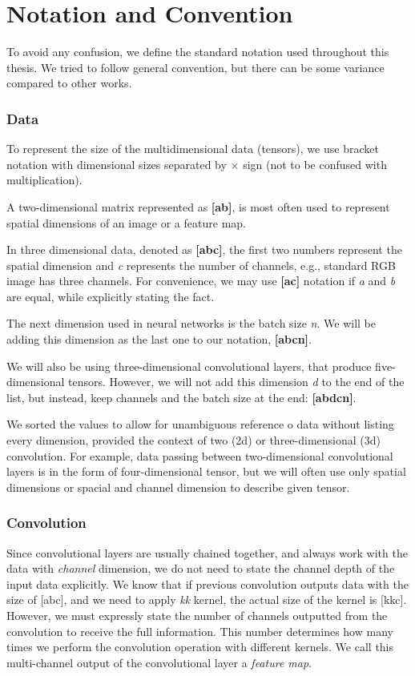\section{Notation and Convention}
\label{sec:notation}
To avoid any confusion, we define the standard notation used throughout this thesis. We tried to follow general convention, but there can be some variance compared to other works.

\subsubsection*{Data}

To represent the size of the multidimensional data (tensors), we use bracket notation with dimensional sizes separated by $\times $ sign (not to be confused with multiplication).

A two-dimensional matrix represented as \textbf{[a\x b]}, is most often used to represent spatial dimensions of an image or a feature map. 

In three dimensional data, denoted as \textbf{[a\x b\x c]}, the first two numbers represent the spatial dimension and \textit{c} represents the number of channels, e.g., standard RGB image has three channels. For convenience, we may use \textbf{[a\x c]} notation if \textit{a} and \textit{b} are equal, while explicitly stating the fact.

The next dimension used in neural networks is the batch size \textit{n}. We will be adding this dimension as the last one to our notation, \textbf{[a\x b\x c\x n]}.

We will also be using three-dimensional convolutional layers, that produce five-dimensional tensors. However, we will not add this dimension \textit{d} to the end of the list, but instead, keep channels and the batch size at the end: \textbf{[a\x b\x d\x c\x n]}. 

We sorted the values to allow for unambiguous reference o data without listing every dimension, provided the context of two (2d) or three-dimensional (3d) convolution. For example, data passing between two-dimensional convolutional layers is in the form of four-dimensional tensor, but we will often use only spatial dimensions or spacial and channel dimension to describe given tensor.

\subsubsection*{Convolution}
Since convolutional layers are usually chained together, and always work with the data with \textit{channel} dimension, we do not need to state the channel depth of the input data explicitly. We know that if previous convolution outputs data with the size of [a\x b\x c], and we need to apply \textit{k\x k} kernel, the actual size of the kernel is [k\x k\x c]. However, we must expressly state the number of channels outputted from the convolution to receive the full information. This number determines how many times we perform the convolution operation with different kernels. We call this multi-channel output of the convolutional layer a \textit{feature map}.

